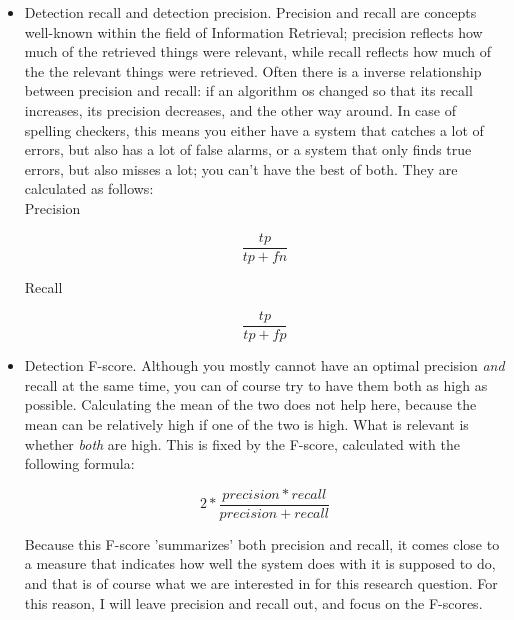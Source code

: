 \documentclass[12pt]{article}
\begin{document}
\begin{itemize}
\item Detection recall and detection precision. 
Precision and recall are concepts well-known within the field of Information Retrieval; precision reflects how much of the retrieved things were relevant, while recall reflects how much of the the relevant things were retrieved. Often there is a inverse relationship between precision and recall: if an algorithm os changed so that its recall increases, its precision decreases, and the other way around. In case of spelling checkers, this means you either have a system that catches a lot of errors, but also has a lot of false alarms, or a system that only finds true errors, but also misses a lot; you can't have the best of both. They are calculated as follows:\\

Precision

\[
\frac{tp}{tp+fn}
\]

Recall

\[
\frac{tp}{tp+fp}
\]

\item Detection F-score. 
Although you mostly cannot have an optimal precision \emph{and} recall at the same time, you can of course try to have them both as high as possible. Calculating the mean of the two does not help here, because the mean can be relatively high if one of the two is high. What is relevant is whether \emph{both} are high. This is fixed by the F-score, calculated with the following formula:

\[
2 * \frac{precision * recall}{precision + recall}
\]

Because this F-score 'summarizes' both precision and recall, it comes close to a measure that indicates how well the system does with it is supposed to do, and that is of course what we are interested in for this research question. For this reason, I will leave precision and recall out, and focus on the F-scores.

\end{itemize}
\end{document}
